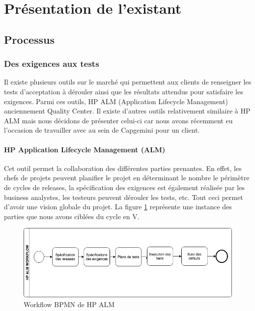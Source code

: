 \section{Présentation de l'existant}

    \subsection{Processus}
        \subsubsection{Des exigences aux tests}
        Il existe plusieurs outils sur le marché qui permettent aux clients de renseigner les tests d’acceptation à dérouler ainsi que les résultats attendus pour satisfaire les exigences. Parmi ces outils, HP ALM (Application Lifecycle Management) anciennement Quality Center. Il existe d’autres outils relativement similaire à HP ALM mais nous décidons de présenter celui-ci car nous avons récemment eu l’occasion de travailler avec au sein de Capgemini pour un client.
        
        \paragraph{HP Application Lifecycle Management (ALM)} \protect
        
        Cet outil permet la collaboration des différentes parties prenantes. En effet, les chefs de projets peuvent planifier le projet en déterminant le nombre le périmètre de cycles de releases, la spécification des exigences est également réalisée par les business analystes, les testeurs peuvent dérouler les tests, etc. Tout ceci permet d'avoir une vision globale du projet. La figure \ref{fig:hp} représente une instance des parties que nous avons ciblées du cycle en V. 
        
         \begin{figure}[H]
                \centering
                \includegraphics[width=\textwidth]{images/hpworkflowbpmn.png}
                \caption{Workflow BPMN de HP ALM}
                \label{fig:hp}
            \end{figure}
        

